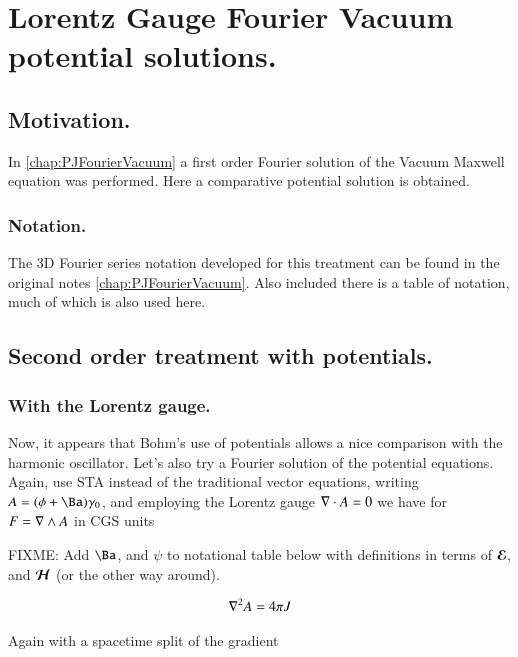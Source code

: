 \chapter{Lorentz Gauge Fourier Vacuum potential solutions.}
\label{chap:potentialFourier}
\date{ Feb 07, 2009.  $RCSfile: potentialFourier.tex,v $ Last $Revision: 1.7 $ $Date: 2009/06/15 00:48:32 $ }

\section{Motivation.}

In \ref{chap:PJFourierVacuum} a first order Fourier solution of the Vacuum
Maxwell equation was performed.  Here a comparative potential solution
is obtained.  

\subsection{Notation. }

The 3D Fourier series notation developed for this treatment can be found 
in the original notes \ref{chap:PJFourierVacuum}.  Also included there is a
table of notation, much of which is also used here.

\section{Second order treatment with potentials. }

\subsection{With the Lorentz gauge. }

Now, it appears that Bohm's use of potentials allows a nice comparison with the harmonic oscillator.  Let's also try a Fourier solution of the 
potential equations.  Again, use STA instead of the traditional vector equations, writing $A = (\phi + \Ba)\gamma_0$, and employing the Lorentz gauge
$\nabla \cdot A = 0$ we have for $F = \nabla \wedge A$ in CGS units

FIXME: Add $\Ba$, and $\psi$ to notational table below with definitions in terms of $\boldsymbol{\mathcal{E}}$, and $\boldsymbol{\mathcal{H}}$ (or the other way around).

\begin{align*}
\nabla^2 A = 4 \pi J
\end{align*}

Again with a spacetime split of the gradient


